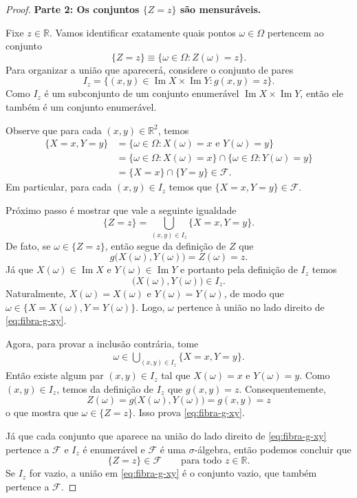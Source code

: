 \documentclass[12pt,portuguese]{article}
\theoremstyle{definition}
\begin{document}
\begin{proof}
\medskip
\noindent\textbf{Parte 2: Os conjuntos $\{Z=z\}$ são mensuráveis.}

Fixe $z\in\mathbb{R}$. Vamos identificar exatamente quais pontos
$\omega\in\Omega$ pertencem ao conjunto
\[
  \{Z=z\}\equiv \{\omega\in\Omega:Z(\omega)=z\}.
\]
Para organizar a união que aparecerá, considere o conjunto de pares
\[
  I_z=\bigl\{(x,y)\in\operatorname{Im}X\times\operatorname{Im}Y:
                    g(x,y)=z\bigr\}.
\]
Como $I_z$ é um subconjunto de um conjunto enumerável
$\operatorname{Im}X\times\operatorname{Im}Y$, então 
ele também é um conjunto enumerável.

Observe que para cada $(x,y)\in \mathbb{R}^2$, temos
\begin{align*} 
\{X=x,Y=y\}
  &=\{\omega\in\Omega:X(\omega)=x\text{ e }Y(\omega)=y\} \\
  &=\{\omega\in\Omega:X(\omega)=x\}
    \cap\{\omega\in\Omega:Y(\omega)=y\} \\
  &=\{X=x\}\cap \{Y=y\} \in\mathcal{F}.
\end{align*}
Em particular, para cada $(x,y)\in I_{z}$ temos que
$\{X=x,Y=y\}\in\mathcal{F}$. 

Próximo passo é mostrar que vale a seguinte igualdade  
\begin{equation}\label{eq:fibra-g-xy}
  \{Z=z\}
  =\bigcup_{(x,y)\in I_z}\{X=x,Y=y\}.
\end{equation}
De fato, se $\omega\in\{Z=z\}$, então segue da definição de $Z$ que 
\[
  g\bigl(X(\omega),Y(\omega)\bigr)=Z(\omega)=z.
\]
Já que $X(\omega)\in\operatorname{Im}X$ e
$Y(\omega)\in\operatorname{Im}Y$ e portanto pela definição de $I_z$ temos
\[
  \bigl(X(\omega),Y(\omega)\bigr)\in I_z.
\]
Naturalmente, $X(\omega)=X(\omega)$ e $Y(\omega)=Y(\omega)$, de modo que
$\omega\in\{X=X(\omega),Y=Y(\omega)\}$. Logo, $\omega$ pertence à união
no lado direito de \eqref{eq:fibra-g-xy}.

Agora, para provar a inclusão contrária, tome
\begin{align*}
\omega\in\bigcup_{(x,y)\in I_z}\{X=x,Y=y\}. 
\end{align*}
Então existe algum par $(x,y)\in I_z$ tal que $X(\omega)=x$ e $Y(\omega)=y$. Como
$(x,y)\in I_z$, temos da definição de $I_z$ que $g(x,y)=z$. Consequentemente,
\[
  Z(\omega)
  =g\bigl(X(\omega),Y(\omega)\bigr)
  =g(x,y)
  =z
\]
o que mostra que $\omega\in\{Z=z\}$. Isso prova \eqref{eq:fibra-g-xy}.


Já que cada conjunto que aparece na união do lado direito de
\eqref{eq:fibra-g-xy} pertence a $\mathcal{F}$ e $I_z$ é enumerável 
e $\mathcal{F}$ é uma $\sigma$-álgebra, então podemos concluir que 
\[
  \{Z=z\}\in\mathcal{F}
  \qquad\text{para todo }z\in\mathbb{R}.
\]
Se $I_z$ for vazio, a união em \eqref{eq:fibra-g-xy} é o conjunto vazio,
que também pertence a $\mathcal{F}$.


\end{proof}
\end{document}
